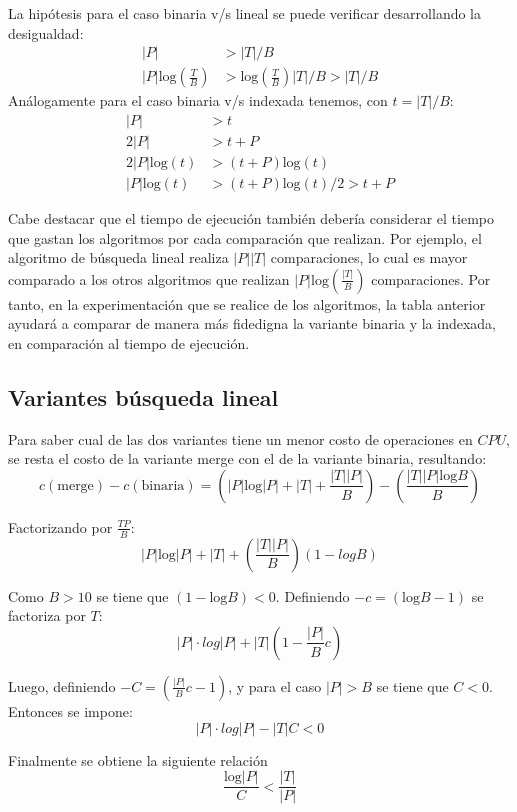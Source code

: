\documentclass[11pt]{article}
\begin{document}
La hipótesis para el caso binaria v/s lineal se puede verificar desarrollando la desigualdad:
\begin{align}
    |P| &> |T|/B \\ 
    |P| \text{log}\left(\frac{T}{B}\right) &> \text{log}\left(\frac{T}{B}\right) |T|/B > |T|/B 
\end{align}
Análogamente para el caso binaria v/s indexada tenemos, con $t=|T|/B$:
\begin{align}
    |P| &> t \\ 
    2|P| &> t + P \\
    2|P| \text{log}(t) &>  (t + P) \text{log}(t) \\ 
    |P| \text{log}(t) &>  (t + P) \text{log}(t)/2 > t + P
\end{align}

Cabe destacar que el tiempo de ejecución también debería considerar el tiempo que gastan los algoritmos por cada comparación que realizan. Por ejemplo, el algoritmo de búsqueda lineal realiza $|P||T|$ comparaciones, lo cual es mayor comparado a los otros algoritmos que realizan $|P|\text{log}\left(\frac{|T|}{B}\right)$ comparaciones. Por tanto, en la experimentación que se realice de los algoritmos, la tabla anterior ayudará a comparar de manera más fidedigna la variante binaria y la indexada, en comparación al tiempo de ejecución.

\subsection{Variantes búsqueda lineal}
Para saber cual de las dos variantes tiene un menor costo de operaciones en $CPU$, se resta el costo de la variante merge con el de la variante binaria, resultando:
$$
c(\text{merge}) - c(\text{binaria}) = \left(|P| \text{log} |P| + |T| + \frac{|T||P|}{B}\right) - \left(\frac{|T||P|\text{log} B}{B}\right)
$$

Factorizando por $\frac{TP}{B}$:
$$
|P| \text{log}|P| + |T| + \left(\frac{|T||P|}{B}\right)(1 - log B)
$$

Como $B>10$ se tiene que $(1-\text{log} B)<0$. Definiendo $-c = (\text{log} B - 1)$ se factoriza por $T$:
$$
|P|\cdot log |P| + |T|\left(1 - \frac{|P|}{B}c\right)
$$

Luego, definiendo $-C= \left(\frac{|P|}{B} c - 1\right)$, y para el caso $|P|>B$ se tiene que $C<0$. Entonces se impone:
$$
|P|\cdot log |P| - |T|C < 0
$$

Finalmente se obtiene la siguiente relación
$$
\frac{ \text{log} |P|}{C} < \frac{|T|}{|P|}
$$
\end{document}

